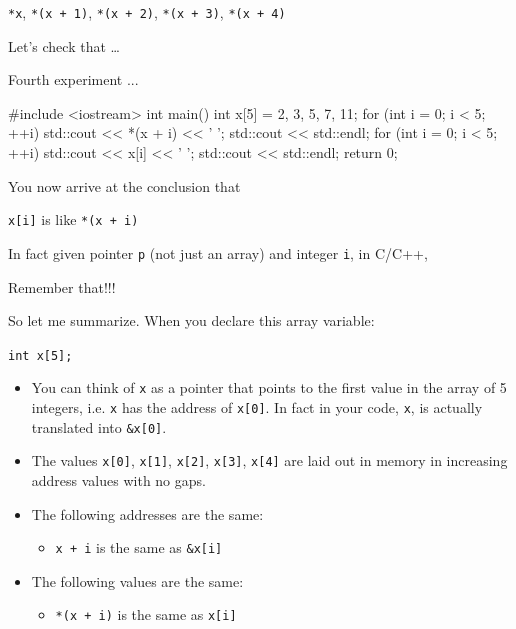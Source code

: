 \begin{center}
\texttt{*x}, \texttt{*(x + 1)}, \texttt{*(x + 2)}, \texttt{*(x + 3)}, \texttt{*(x + 4)}
\end{center}

Let's check that \ldots{}

Fourth experiment ...

\begin{consolethree}[escapeinside=||]
#include <iostream>
int main()
{
    int x[5] = {2, 3, 5, 7, 11};
    for (int i = 0; i < 5; ++i)
    {
        std::cout << *(x + i) << ' ';
    }
    std::cout << std::endl;
    for (int i = 0; i < 5; ++i)
    {
        std::cout << x[i] << ' ';
    }
    std::cout << std::endl;
    return 0;
}
\end{consolethree}

You now arrive at the conclusion that
\begin{center}
\texttt{x[i]} is like \texttt{*(x + i)}
\end{center}

In fact given  pointer \texttt{p} (not just an array) and integer \texttt{i}, in C/C++,

\texttt{}\texttt{}

Remember that!!!

So let me summarize. When you declare this array variable:

\verb!int x[5];!

\begin{itemize}
\item You can think of \texttt{x} as a pointer that points to the first value
  in the array of 5 integers, i.e. \texttt{x} has the address of
  \texttt{x[0]}. In fact in your code, \texttt{x}, is actually
  translated into \texttt{\&x[0]}.
\item The values \texttt{x[0]}, \texttt{x[1]}, \texttt{x[2]},
  \texttt{x[3]}, \texttt{x[4]} are laid out in memory in increasing
  address values with no gaps.
\item The following addresses are the same:
  \begin{itemize}
  \item \texttt{x + i}          is the same as      \texttt{\&x[i]}
  \end{itemize}
\item The following values are the same:
  \begin{itemize}
  \item \texttt{*(x + i)}       is the same as      \texttt{x[i]}
  \end{itemize}
\end{itemize}

